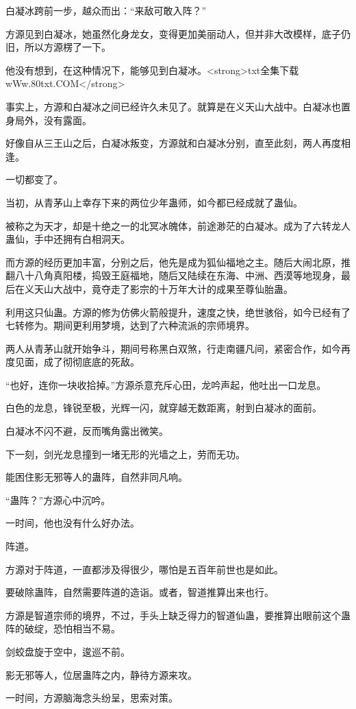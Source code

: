 \begin{this_body}
白凝冰跨前一步，越众而出：“来敌可敢入阵？”

方源见到白凝冰，她虽然化身龙女，变得更加美丽动人，但并非大改模样，底子仍旧，所以方源楞了一下。

他没有想到，在这种情况下，能够见到白凝冰。<strong>txt全集下载wWw.80txt.COM</strong>

事实上，方源和白凝冰之间已经许久未见了。就算是在义天山大战中。白凝冰也置身局外，没有露面。

好像自从三王山之后，白凝冰叛变，方源就和白凝冰分别，直至此刻，两人再度相逢。

一切都变了。

当初，从青茅山上幸存下来的两位少年蛊师，如今都已经成就了蛊仙。

被称之为天才，却是十绝之一的北冥冰魄体，前途渺茫的白凝冰。成为了六转龙人蛊仙，手中还拥有白相洞天。

而方源的经历更加丰富，分别之后，他先是成为狐仙福地之主。随后大闹北原，推翻八十八角真阳楼，捣毁王庭福地，随后又陆续在东海、中洲、西漠等地现身，最后在义天山大战中，竟夺走了影宗的十万年大计的成果至尊仙胎蛊。

利用这只仙蛊。方源的修为仿佛火箭般提升，速度之快，绝世骇俗，如今已经有了七转修为。期间更利用梦境，达到了六种流派的宗师境界。

两人从青茅山就开始争斗，期间号称黑白双煞，行走南疆凡间，紧密合作，如今再度见面，成了彻彻底底的死敌。

“也好，连你一块收拾掉。”方源杀意充斥心田，龙吟声起，他吐出一口龙息。

白色的龙息，锋锐至极，光辉一闪，就穿越无数距离，射到白凝冰的面前。

白凝冰不闪不避，反而嘴角露出微笑。

下一刻，剑光龙息撞到一堵无形的光墙之上，劳而无功。

能困住影无邪等人的蛊阵，自然非同凡响。

“蛊阵？”方源心中沉吟。

一时间，他也没有什么好办法。

阵道。

方源对于阵道，一直都涉及得很少，哪怕是五百年前世也是如此。

要破除蛊阵，自然需要阵道的造诣。或者，智道推算出来也行。

方源是智道宗师的境界，不过，手头上缺乏得力的智道仙蛊，要推算出眼前这个蛊阵的破绽，恐怕相当不易。

剑蛟盘旋于空中，逡巡不前。

影无邪等人，位居蛊阵之内，静待方源来攻。

一时间，方源脑海念头纷呈，思索对策。


\end{this_body}
